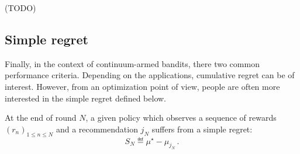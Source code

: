 (TODO)

\subsection{Simple regret}\label{sec:mab.performance.simple}

Finally, in the context of continuum-armed bandits, there two common performance criteria. Depending on the applications, cumulative regret can be of interest. However, from an optimization point of view, people are often more interested in the \gls{simple regret} defined below. 

\begin{definition}\label{def:stoch_mab.simple_regret}
\begin{leftbar}[defnbar]
	At the end of round $N$, a given policy which observes a sequence of rewards $(r_n)_{1 \leq n \leq N}$ and a recommendation $j_N$ suffers from a simple regret:
	\[
		S_N \eqdef \mu^{\star} - \mu_{j_N}\,.
	\]
\end{leftbar}
\end{definition}